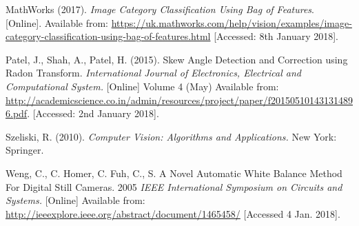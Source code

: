 \documentclass[a4paper, 12pt]{article}
\begin{document}
MathWorks (2017). \textit{Image Category Classification Using Bag of Features}. [Online]. Available from: \url{https://uk.mathworks.com/help/vision/examples/image-category-classification-using-bag-of-features.html} [Accessed: 8th January 2018].

Patel, J., Shah, A., Patel, H. (2015). Skew Angle Detection and Correction using Radon Transform. \textit{International Journal of Electronics, Electrical and Computational System.} [Online] Volume 4 (May) Available from: \url{http://academicscience.co.in/admin/resources/project/paper/f201505101431314896.pdf}. [Accessed: 2nd January 2018].

Szeliski, R. (2010). \textit{Computer Vision: Algorithms and Applications.} New York: Springer.

Weng, C., C. Homer, C. Fuh, C., S. A Novel Automatic White Balance Method For Digital Still Cameras. 2005 \textit{IEEE International Symposium on Circuits and Systems.} [Online] Available from: \url{http://ieeexplore.ieee.org/abstract/document/1465458/} [Accessed 4 Jan. 2018].
\end{document}
